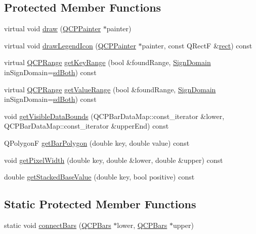 \subsection*{Protected Member Functions}
\begin{DoxyCompactItemize}
\item 
virtual void \hyperlink{class_q_c_p_bars_a42b894e34dac799f90ff3700706b31df}{draw} (\hyperlink{class_q_c_p_painter}{Q\+C\+P\+Painter} $\ast$painter)
\item 
virtual void \hyperlink{class_q_c_p_bars_ad4fb35d2ab7d2aa460a6612aff3e7a15}{draw\+Legend\+Icon} (\hyperlink{class_q_c_p_painter}{Q\+C\+P\+Painter} $\ast$painter, const Q\+Rect\+F \&\hyperlink{_gen_blob_8m_aea8f6815d9a63491fc422c5572c6b3c3}{rect}) const 
\item 
virtual \hyperlink{class_q_c_p_range}{Q\+C\+P\+Range} \hyperlink{class_q_c_p_bars_a93cfdc8a535f36aeb087acca49c00662}{get\+Key\+Range} (bool \&found\+Range, \hyperlink{class_q_c_p_abstract_plottable_a661743478a1d3c09d28ec2711d7653d8}{Sign\+Domain} in\+Sign\+Domain=\hyperlink{class_q_c_p_abstract_plottable_a661743478a1d3c09d28ec2711d7653d8a082b98cfb91a7363a3b5cd17b0c1cd60}{sd\+Both}) const 
\item 
virtual \hyperlink{class_q_c_p_range}{Q\+C\+P\+Range} \hyperlink{class_q_c_p_bars_ada96e20309570d1488c165596cb2647f}{get\+Value\+Range} (bool \&found\+Range, \hyperlink{class_q_c_p_abstract_plottable_a661743478a1d3c09d28ec2711d7653d8}{Sign\+Domain} in\+Sign\+Domain=\hyperlink{class_q_c_p_abstract_plottable_a661743478a1d3c09d28ec2711d7653d8a082b98cfb91a7363a3b5cd17b0c1cd60}{sd\+Both}) const 
\item 
void \hyperlink{class_q_c_p_bars_af73d2032be0a64d2692bb76b08c79ec2}{get\+Visible\+Data\+Bounds} (Q\+C\+P\+Bar\+Data\+Map\+::const\+\_\+iterator \&lower, Q\+C\+P\+Bar\+Data\+Map\+::const\+\_\+iterator \&upper\+End) const 
\item 
Q\+Polygon\+F \hyperlink{class_q_c_p_bars_a1d118a76662cfd691a78c6f573e3f78c}{get\+Bar\+Polygon} (double key, double value) const 
\item 
void \hyperlink{class_q_c_p_bars_a794eefe4fb29b9b40583654ccbf460dc}{get\+Pixel\+Width} (double key, double \&lower, double \&upper) const 
\item 
double \hyperlink{class_q_c_p_bars_ae9b0c2fad9f29030c84bb6e62a4b605f}{get\+Stacked\+Base\+Value} (double key, bool positive) const 
\end{DoxyCompactItemize}
\subsection*{Static Protected Member Functions}
\begin{DoxyCompactItemize}
\item 
static void \hyperlink{class_q_c_p_bars_a6ea37802cd22f97235cab614b14b9f19}{connect\+Bars} (\hyperlink{class_q_c_p_bars}{Q\+C\+P\+Bars} $\ast$lower, \hyperlink{class_q_c_p_bars}{Q\+C\+P\+Bars} $\ast$upper)
\end{DoxyCompactItemize}
